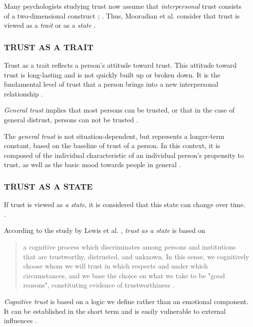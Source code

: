 \documentclass[sigchi]{acmart}
\begin{document}
Many psychologists studying trust now assume that \textit{interpersonal} trust consists of a two-dimensional construct \citep{johnson2005cognitive}; \citep{cook1980new}. Thus, Mooradian et al. consider that trust is viewed as a \textit{trait} or as a \textit{state} \citep[pp. 524-525]{mooradian2006trusts}.

\subsubsection{TRUST AS A TRAIT}
Trust as a trait reflects a person's attitude toward trust. This attitude toward trust is long-lasting and is not quickly built up or broken down. It is the fundamental level of trust that a person brings into a new interpersonal relationship \citep[p. 11]{couch1996assessment}. 

\textit{General trust} implies that most persons can be trusted, or that in the case of general distrust, persons can not be trusted \citep[p. 409]{stolle2002trusting}.

The \textit{general trust} is not situation-dependent, but represents a longer-term constant, based on the baseline of trust of a person. In this context, it is composed of the individual characteristic of an individual person's propensity to trust, as well as the basic mood towards people in general \citep[p. 11]{couch1996assessment}.

\subsubsection{TRUST AS A STATE}
If trust is viewed as \textit{a state}, it is considered that this state can change over time. \citep[p. 712]{mayer1995integrative}.

According to the study by Lewis et al. \citep[pp. 970-971]{lewis1985trust}, \textit{trust as a state} is based on
\begin{quote} \grqq{}a cognitive process which discriminates among persons and institutions that are trustworthy, distrusted, and unknown. In this sense, we cognitively choose whom we will trust in which respects and under which circumstances, and we base the choice on what we take to be "good reasons", constituting evidence of trustworthiness\grqq{} \citep[p. 970]{lewis1985trust}.\end{quote}

\textit{Cognitive trust} is based on a logic we define rather than an emotional component. It can be established in the short term and is easily vulnerable to external influences \citep[p. 970]{lewis1985trust}. 
\end{document}
